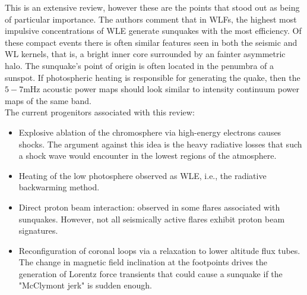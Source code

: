 \documentclass[11pt]{article}
\begin{document}
This is an extensive review, however these are the points that stood out as being of particular importance. The authors comment that in WLFs, the highest most impulsive concentrations of WLE generate sunquakes with the most efficiency. Of these compact events there is often similar features seen in both the seismic and WL kernels, that is, a bright inner core surrounded by an fainter asymmetric halo. The sunquake's point of origin is often located in the penumbra of a sunspot. If photospheric heating is responsible for generating the quake, then the $5-7$mHz acoustic power maps should look similar to intensity continuum power maps of the same band.\\
The current progenitors associated with this review:
\begin{itemize}
\item Explosive ablation of the chromosphere via high-energy electrons causes shocks. The argument against this idea is the heavy radiative losses that such a shock wave would encounter in the lowest regions of the atmosphere.  
\item Heating of the low photosphere observed as WLE, i.e., the radiative backwarming method.
\item Direct proton beam interaction: observed in some flares associated with sunquakes. However, not all seismically active flares exhibit proton beam signatures. 
\item Reconfiguration of coronal loops via a relaxation to lower altitude flux tubes. The change in magnetic field inclination at the footpoints drives the generation of Lorentz force transients that could cause a sunquake if the "McClymont jerk" is sudden enough.
\end{itemize}
\end{document}

